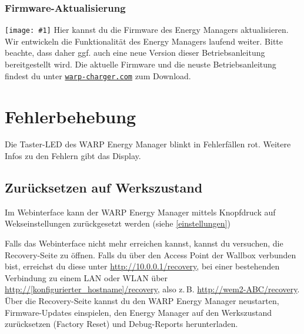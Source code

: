 \documentclass[a4paper,10pt]{article}
\newcommand{\gfx}[1]{\texttt{[image: \#1]}}
\newcommand\rurl[2]{%
  \href{#1}{\nolinkurl{#2}}%
}
\begin{document}
\begin{multicols*}{2}
	\subsubsection{Firmware-Aktualisierung}
	\label{firmware-update}
	\gfx{./img/resized/web_firmware_update}
	Hier kannst du die Firmware des Energy Managers aktualisieren.
	Wir entwickeln die Funktionalität
	des Energy Managers laufend weiter. Bitte beachte, dass daher ggf. auch eine neue
	Version dieser Betriebsanleitung bereitgestellt wird.
	Die aktuelle Firmware und die neuste Betriebsanleitung findest du unter
	\rurl{https://warp-charger.com}{warp-charger.com} zum Download.

	\newpage
	\section{Fehlerbehebung}
	\label{fehlerbehebung}
	Die Taster-LED des WARP Energy Manager blinkt in Fehlerfällen rot. Weitere Infos zu den Fehlern gibt das Display.
    
    \subsection{Zurücksetzen auf Werkszustand}
    
    Im Webinterface kann der WARP Energy Manager mittels Knopfdruck auf Wekseinstellungen zurückgesetzt werden (siehe \ref{einstellungen})
    
    Falls das Webinterface nicht mehr erreichen kannst, kannst du versuchen, die Recovery-Seite zu öffnen.
	Falls du über den Access Point der Wallbox verbunden bist, erreichst du diese unter \url{http://10.0.0.1/recovery},
	bei einer bestehenden Verbindung zu einem LAN oder WLAN über
	\url{http://[konfigurierter_hostname]/recovery}, also z.\,B. \url{http://wem2-ABC/recovery}.
	Über die Recovery-Seite kannst du den WARP Energy Manager neustarten, Firmware-Updates einspielen,
	den Energy Manager auf den Werkszustand zurücksetzen (Factory Reset) und Debug-Reports
	herunterladen.


\end{multicols*}
\end{document}

